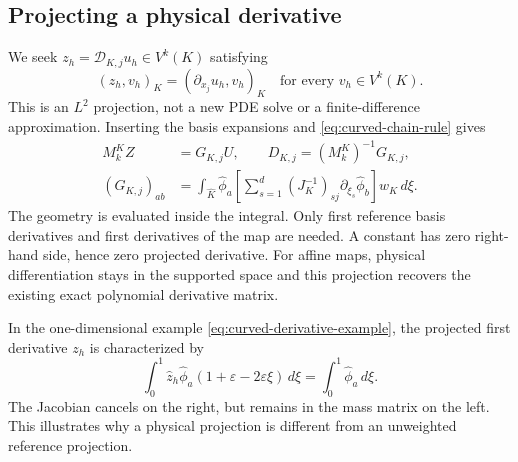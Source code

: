\subsection{Projecting a physical derivative}
We seek $z_h=\mathscr D_{K,j}u_h\in V^k(K)$ satisfying
\begin{equation}
 (z_h,v_h)_K=(\partial_{x_j}u_h,v_h)_K
 \quad\text{for every }v_h\in V^k(K).
 \label{eq:curved-derivative-weak}
\end{equation}
This is an $L^2$ projection, not a new PDE solve or a finite-difference
approximation. Inserting the basis expansions and
\cref{eq:curved-chain-rule} gives
\begin{align}
 M_k^K Z&=G_{K,j}U,\qquad D_{K,j}=(M_k^K)^{-1}G_{K,j},\\
 (G_{K,j})_{ab}&=\int_{\widehat K}\widehat\phi_a
  \left[\sum_{s=1}^d(J_K^{-1})_{sj}
                   \partial_{\xi_s}\widehat\phi_b\right]w_K\,d\xi.
 \label{eq:curved-derivative-assembly}
\end{align}
The geometry is evaluated inside the integral. Only first reference
basis derivatives and first derivatives of the map are needed. A constant
has zero right-hand side, hence zero projected derivative. For affine maps,
physical differentiation stays in the supported space and this projection
recovers the existing exact polynomial derivative matrix.

In the one-dimensional example \cref{eq:curved-derivative-example}, the
projected first derivative $z_h$ is characterized by
\begin{equation}
 \int_0^1\widehat z_h\widehat\phi_a
       (1+\varepsilon-2\varepsilon\xi)\,d\xi
 =\int_0^1\widehat\phi_a\,d\xi.
\end{equation}
The Jacobian cancels on the right, but remains in the mass matrix on the left.
This illustrates why a physical projection is different from an unweighted
reference projection.

